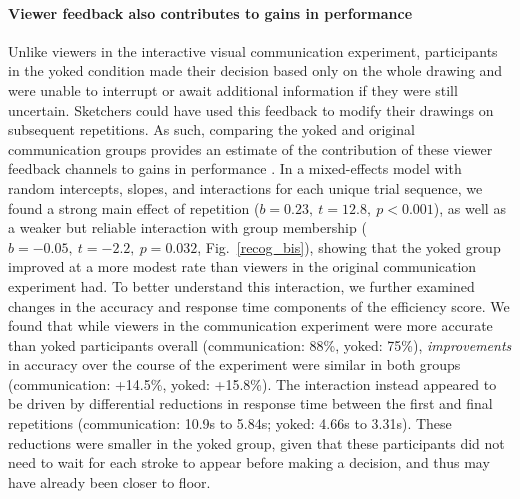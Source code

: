 \documentclass[11pt,letterpaper]{article}
\begin{document}
\paragraph{Viewer feedback also contributes to gains in performance}
Unlike viewers in the interactive visual communication experiment, participants in the yoked condition made their decision based only on the whole drawing and were unable to interrupt or await additional information if they were still uncertain.
Sketchers could have used this feedback to modify their drawings on subsequent repetitions.
As such, comparing the yoked and original communication groups provides an estimate of the contribution of these viewer feedback channels to gains in performance \cite{schober_understanding_1989}.
In a mixed-effects model with random intercepts, slopes, and interactions for each unique trial sequence, we found a %
strong main effect of repetition ($b = 0.23, ~t = 12.8,~p < 0.001$), as well as a weaker but reliable interaction with group membership ($b = -0.05, ~t = -2.2, ~p = 0.032$, Fig.~\ref{recog_bis}), showing that the yoked group improved at a more modest rate than viewers in the original communication experiment had.
To better understand this interaction, we further examined changes in the accuracy and response time components of the efficiency score.
We found that while viewers in the communication experiment were more accurate than yoked participants overall (communication: 88\%, yoked: 75\%), %
\emph{improvements} in accuracy over the course of the experiment were similar in both groups (communication: +14.5\%, yoked: +15.8\%).
The interaction instead appeared to be driven by differential reductions in response time between the first and final repetitions (communication: 10.9s to 5.84s; yoked: 4.66s to 3.31s).
These reductions were smaller in the yoked group, given that these participants did not need to wait for each stroke to appear before making a decision, and thus may have already been closer to floor.
\end{document}
